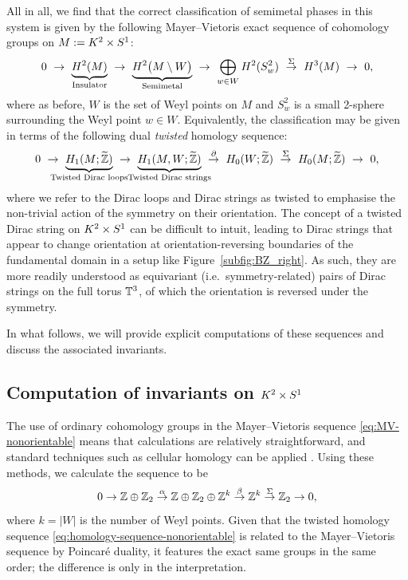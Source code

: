 All in all, we find that the correct classification of semimetal phases in this system is given by the following Mayer--Vietoris exact sequence of cohomology groups on $M := K^2\times S^1$:
\begin{equation}\label{eq:MV-nonorientable}
	0\ \to\ \underbrace{H^2(M)}_{\mathclap{\text{Insulator}}}\ \to\ \underbrace{H^2\big(M\setminus W\big)}_{\mathclap{\text{Semimetal}}}\ \to\ \bigoplus_{w\in W} H^2(S_w^2)\ \overset{\Sigma}{\to}\ H^3(M)\ \to\ 0,
\end{equation}
where as before, $W$ is the set of Weyl points on $M$ and $S_w^2$ is a small 2-sphere surrounding the Weyl point $w\in W$. Equivalently, the classification may be given in terms of the following dual \emph{twisted} homology sequence:
\begin{equation}\label{eq:homology-sequence-nonorientable}
	0\ \to\ \underbrace{H_1(M;\ext{\Z})}_{\mathclap{\text{Twisted Dirac loops}}}\ \to\ \underbrace{H_1(M, W;\ext{\Z})}_{\mathclap{\text{Twisted Dirac strings}}}\ \overset{\partial}{\to}\ H_0(W;\ext{\Z})\ \overset{\Sigma}{\to}\ H_0(M;\ext{\Z})\ \to\ 0,
\end{equation}
where we refer to the Dirac loops and Dirac strings as twisted to emphasise the non-trivial action of the symmetry on their orientation. The concept of a twisted Dirac string on $K^2\times S^1$ can be difficult to intuit, leading to Dirac strings that appear to change orientation at orientation-reversing boundaries of the fundamental domain in a setup like Figure~\ref{subfig:BZ_right}. As such, they are more readily understood as equivariant (i.e.\ symmetry-related) pairs of Dirac strings on the full torus $\mathbb{T}^3$, of which the orientation is reversed under the symmetry.

In what follows, we will provide explicit computations of these sequences and discuss the associated invariants.


\subsection{Computation of invariants on \texorpdfstring{$K^2\times S^1$}{K²×S¹}}\label{sec:invariants}

The use of ordinary cohomology groups in the Mayer--Vietoris sequence \eqref{eq:MV-nonorientable} means that calculations are relatively straightforward, and standard techniques such as cellular homology can be applied \parencite[\S 2.2]{Hatcher_algebraic-topology}. Using these methods, we calculate the sequence to be
\begin{equation}\label{eq:explicit-sequence-nonorientable}
	0\to \mathbb{Z}\oplus\mathbb{Z}_2 \overset{\alpha}{\to} \mathbb{Z}\oplus\mathbb{Z}_2\oplus\mathbb{Z}^k \overset{\beta}{\to} \mathbb{Z}^k \overset{\Sigma}{\to} \mathbb{Z}_2 \to 0,
\end{equation}
where $k = |W|$ is the number of Weyl points. Given that the twisted homology sequence \eqref{eq:homology-sequence-nonorientable} is related to the Mayer--Vietoris sequence by Poincaré duality, it features the exact same groups in the same order; the difference is only in the interpretation. 

